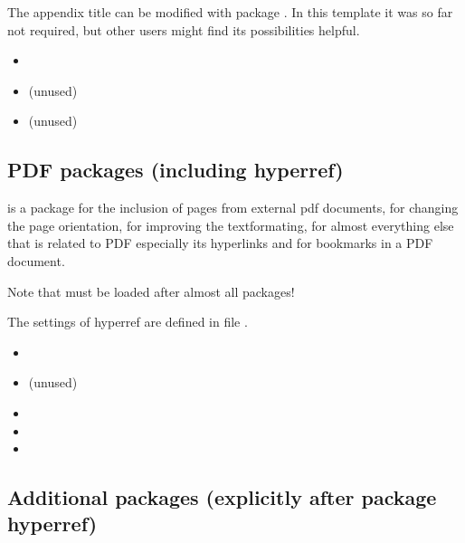The appendix title can be modified with package . In this template it was so far not required, but other users might find its possibilities helpful.

\begin{itemize}[noitemsep]
\item {}
\item {} (unused)
\item {} (unused)
\end{itemize}


\subsection{PDF packages (including hyperref)}
\label{sec:packages:pdf}

 is a package for the inclusion of pages from external pdf documents,
 for changing the page orientation,
 for improving the textformating,
 for almost everything else that is related to PDF especially its hyperlinks and 
 for bookmarks in a PDF document.

Note that  must be loaded after almost all packages!

The settings of hyperref are defined in file 
.

\begin{itemize}[noitemsep]
\item {}
\item {} (unused)
\item {}
\item {}
\item {}
\end{itemize}


\subsection{Additional packages  (explicitly after package hyperref)}
\label{sec:packages:additional}

